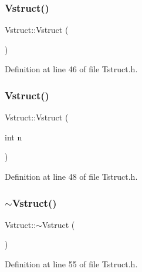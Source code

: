 \subsubsection{\texorpdfstring{Vstruct()}{Vstruct()}\hspace{0.1cm}{\footnotesize\ttfamily [1/2]}}
{\footnotesize\ttfamily Vstruct\+::\+Vstruct (\begin{DoxyParamCaption}{ }\end{DoxyParamCaption})\hspace{0.3cm}{\ttfamily [inline]}}



Definition at line 46 of file Tstruct.\+h.

\mbox{\label{structVstruct_a579bc58cb4f2ce68cf4e89aef9aa297c}} 
\subsubsection{\texorpdfstring{Vstruct()}{Vstruct()}\hspace{0.1cm}{\footnotesize\ttfamily [2/2]}}
{\footnotesize\ttfamily Vstruct\+::\+Vstruct (\begin{DoxyParamCaption}\item[{int}]{n }\end{DoxyParamCaption})\hspace{0.3cm}{\ttfamily [inline]}}



Definition at line 48 of file Tstruct.\+h.

\mbox{\label{structVstruct_a48d29547aaec084b8deee40a1ab62710}} 
\subsubsection{\texorpdfstring{$\sim$\+Vstruct()}{~Vstruct()}}
{\footnotesize\ttfamily Vstruct\+::$\sim$\+Vstruct (\begin{DoxyParamCaption}{ }\end{DoxyParamCaption})\hspace{0.3cm}{\ttfamily [inline]}}



Definition at line 55 of file Tstruct.\+h.



